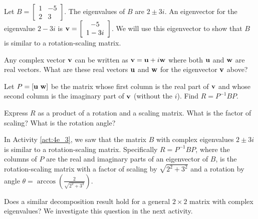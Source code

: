 \begin{activity} \label{act:4e_3} Let $B=\left[ \begin{array}{cr} 1&-5\\2&3 \end{array} \right]$. The eigenvalues of $B$ are $2\pm 3i$.  An eigenvector for the eigenvalue $2-3i$ is $\mathbf{v}=\left[ \begin{array}{c} -5 \\ 1-3i\end{array} \right]$. We will use this eigenvector to show that $B$ is similar to a rotation-scaling matrix.

	\ba
	\item Any complex vector $\mathbf{v}$ can be written as $\mathbf{v}=\mathbf{u}+i\mathbf{w}$ where both $\mathbf{u}$ and $\mathbf{w}$ are real vectors. What are these real vectors $\mathbf{u}$ and $\mathbf{w}$ for the eigenvector $\mathbf{v}$ above?
	
	
	
	\item Let $P=[ \mathbf{u} \ \mathbf{w} ]$ be the matrix whose first column is the real part of $\mathbf{v}$ and whose second column is the imaginary part of $\mathbf{v}$ (without the $i$). Find $R=P^{-1}BP$.
		
	
		
	\item Express $R$ as a product of a rotation and a scaling matrix. What is the factor of scaling? What is the rotation angle?
	
	
				
	\ea
\end{activity}



In Activity \ref{act:4e_3}, we saw that the matrix $B$ with complex eigenvalues $2\pm 3i$ is similar to a rotation-scaling matrix. Specifically $R=P^{-1}BP$, where the columns of $P$ are the real and imaginary parts of an eigenvector of $B$, is the rotation-scaling matrix with a factor of scaling by $\sqrt{2^2+3^2}$ and a rotation by angle $\theta=\arccos(\frac{2}{\sqrt{2^2+3^2}})$. 



Does a similar decomposition result hold for a general $2\times 2$ matrix with complex eigenvalues? We investigate this question in the next activity.



